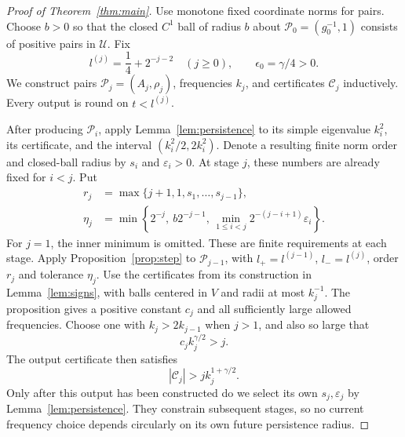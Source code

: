 \begin{proof}[Proof of Theorem~\ref{thm:main}]
Use monotone fixed coordinate norms for pairs. Choose $b>0$ so
that the closed $C^1$ ball of radius $b$ about
$\mathcal P_0=(g_0^{-1},1)$ consists of positive pairs in
$\mathcal U$. Fix
\[
 l^{(j)}=\frac14+2^{-j-2}\quad(j\ge0),\qquad
 \epsilon_0=\gamma/4>0.
\]
We construct pairs $\mathcal P_j=(A_j,\rho_j)$, frequencies $k_j$,
and certificates $\mathcal C_j$ inductively. Every output is round
on $t<l^{(j)}$.

After producing $\mathcal P_i$, apply Lemma~\ref{lem:persistence}
to its simple eigenvalue $k_i^2$, its certificate, and the interval
$(k_i^2/2,2k_i^2)$. Denote a resulting finite norm order and
closed-ball radius by $s_i$ and $\varepsilon_i>0$.
At stage $j$, these numbers are already fixed for $i<j$. Put
\begin{equation}\label{eq:diagonal-budgets}
 \begin{split}
 r_j&=\max\{j+1,1,s_1,\ldots,s_{j-1}\},\\
 \eta_j&=\min\left\{2^{-j},\ b2^{-j-1},\,
 \min_{1\le i<j}2^{-(j-i+1)}\varepsilon_i\right\}.
 \end{split}
\end{equation}
For $j=1$, the inner minimum is omitted. These are finite
requirements at each stage. Apply Proposition~\ref{prop:step}
to $\mathcal P_{j-1}$, with
$l_+=l^{(j-1)}$, $l_-=l^{(j)}$, order $r_j$ and tolerance
$\eta_j$. Use the certificates from its construction in
Lemma~\ref{lem:signs}, with balls centered in $V$ and radii at most
$k_j^{-1}$. The proposition gives a positive constant $c_j$ and all
sufficiently large allowed frequencies. Choose one with
$k_j>2k_{j-1}$ when $j>1$, and also so large that
\[
 c_jk_j^{\gamma/2}>j.
\]
The output certificate then satisfies
\begin{equation}\label{eq:stage-certificate-size}
 |\mathcal C_j|>j k_j^{1+\gamma/2}.
\end{equation}
Only after this output has been constructed do we select its own
$s_j,\varepsilon_j$ by Lemma~\ref{lem:persistence}. They constrain
subsequent stages, so no current frequency choice depends
circularly on its own future persistence radius.


\end{proof}
